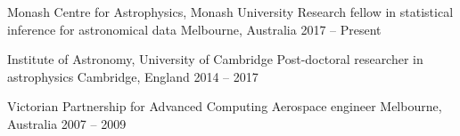 

\begin{cventries}
  \cventry
    {Monash Centre for Astrophysics, Monash University}
    {Research fellow in statistical inference for astronomical data}
    {Melbourne, Australia}
    {2017 -- Present}
    {}

  \cventry
    {Institute of Astronomy, University of Cambridge}
    {Post-doctoral researcher in astrophysics}
    {Cambridge, England}
    {2014 -- 2017}
    {}

  \cventry
    {Victorian Partnership for Advanced Computing}
    {Aerospace engineer}
    {Melbourne, Australia}
    {2007 -- 2009}
    {}
	
\end{cventries}
